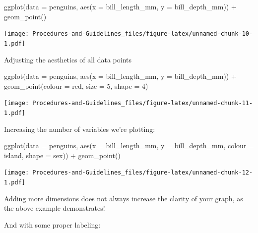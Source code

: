 \documentclass[
]{book}
\newenvironment{Shaded}{\begin{snugshade}}{\end{snugshade}}
\newcommand{\AttributeTok}[1]{\textcolor[rgb]{0.77,0.63,0.00}{#1}}
\newcommand{\DecValTok}[1]{\textcolor[rgb]{0.00,0.00,0.81}{#1}}
\newcommand{\FunctionTok}[1]{\textcolor[rgb]{0.00,0.00,0.00}{#1}}
\newcommand{\NormalTok}[1]{#1}
\newcommand{\SpecialCharTok}[1]{\textcolor[rgb]{0.00,0.00,0.00}{#1}}
\newcommand{\StringTok}[1]{\textcolor[rgb]{0.31,0.60,0.02}{#1}}
\begin{document}
\begin{Shaded}
\begin{Highlighting}[]
\FunctionTok{ggplot}\NormalTok{(}\AttributeTok{data =}\NormalTok{ penguins, }\FunctionTok{aes}\NormalTok{(}\AttributeTok{x =}\NormalTok{ bill\_length\_mm, }\AttributeTok{y =}\NormalTok{ bill\_depth\_mm)) }\SpecialCharTok{+}
  \FunctionTok{geom\_point}\NormalTok{()}
\end{Highlighting}
\end{Shaded}

\texttt{[image: Procedures-and-Guidelines\_files/figure-latex/unnamed-chunk-10-1.pdf]}

Adjusting the aesthetics of all data points

\begin{Shaded}
\begin{Highlighting}[]
\FunctionTok{ggplot}\NormalTok{(}\AttributeTok{data =}\NormalTok{ penguins, }\FunctionTok{aes}\NormalTok{(}\AttributeTok{x =}\NormalTok{ bill\_length\_mm, }\AttributeTok{y =}\NormalTok{ bill\_depth\_mm)) }\SpecialCharTok{+}
  \FunctionTok{geom\_point}\NormalTok{(}\AttributeTok{colour =} \StringTok{\textquotesingle{}red\textquotesingle{}}\NormalTok{, }\AttributeTok{size =} \DecValTok{5}\NormalTok{, }\AttributeTok{shape =} \DecValTok{4}\NormalTok{)}
\end{Highlighting}
\end{Shaded}

\texttt{[image: Procedures-and-Guidelines\_files/figure-latex/unnamed-chunk-11-1.pdf]}

Increasing the number of variables we're plotting:

\begin{Shaded}
\begin{Highlighting}[]
\FunctionTok{ggplot}\NormalTok{(}\AttributeTok{data =}\NormalTok{ penguins, }\FunctionTok{aes}\NormalTok{(}\AttributeTok{x =}\NormalTok{ bill\_length\_mm, }\AttributeTok{y =}\NormalTok{ bill\_depth\_mm, }\AttributeTok{colour =}\NormalTok{ island, }\AttributeTok{shape =}\NormalTok{ sex)) }\SpecialCharTok{+}
  \FunctionTok{geom\_point}\NormalTok{()}
\end{Highlighting}
\end{Shaded}

\texttt{[image: Procedures-and-Guidelines\_files/figure-latex/unnamed-chunk-12-1.pdf]}

Adding more dimensions does not always increase the clarity of your graph, as the above example demonstrates!

And with some proper labeling:
\end{document}
